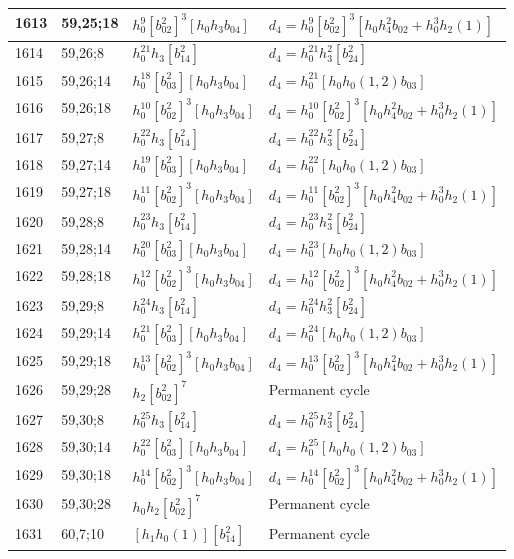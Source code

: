\documentclass{article}
\begin{document}
\begin{longtable}{|l|l|>{\raggedright\arraybackslash}p{6cm}|>{\raggedright\arraybackslash}p{6cm}|}
\hline
1613 & 59,25;18 & $h_0^9[b_{02}^2]^3[h_0h_3b_{04}]$ &$d_{4}=h_0^9[b_{02}^2]^3[h_0h_4^2b_{02} + h_0^3h_2(1)]$\\
\hline
1614 & 59,26;8 & $h_0^{21}h_3[b_{14}^2]$ &$d_{4}=h_0^{21}h_3^2[b_{24}^2]$\\
\hline
1615 & 59,26;14 & $h_0^{18}[b_{03}^2][h_0h_3b_{04}]$ &$d_{4}=h_0^{21}[h_0h_0(1, 2)b_{03}]$\\
\hline
1616 & 59,26;18 & $h_0^{10}[b_{02}^2]^3[h_0h_3b_{04}]$ &$d_{4}=h_0^{10}[b_{02}^2]^3[h_0h_4^2b_{02} + h_0^3h_2(1)]$\\
\hline
1617 & 59,27;8 & $h_0^{22}h_3[b_{14}^2]$ &$d_{4}=h_0^{22}h_3^2[b_{24}^2]$\\
\hline
1618 & 59,27;14 & $h_0^{19}[b_{03}^2][h_0h_3b_{04}]$ &$d_{4}=h_0^{22}[h_0h_0(1, 2)b_{03}]$\\
\hline
1619 & 59,27;18 & $h_0^{11}[b_{02}^2]^3[h_0h_3b_{04}]$ &$d_{4}=h_0^{11}[b_{02}^2]^3[h_0h_4^2b_{02} + h_0^3h_2(1)]$\\
\hline
1620 & 59,28;8 & $h_0^{23}h_3[b_{14}^2]$ &$d_{4}=h_0^{23}h_3^2[b_{24}^2]$\\
\hline
1621 & 59,28;14 & $h_0^{20}[b_{03}^2][h_0h_3b_{04}]$ &$d_{4}=h_0^{23}[h_0h_0(1, 2)b_{03}]$\\
\hline
1622 & 59,28;18 & $h_0^{12}[b_{02}^2]^3[h_0h_3b_{04}]$ &$d_{4}=h_0^{12}[b_{02}^2]^3[h_0h_4^2b_{02} + h_0^3h_2(1)]$\\
\hline
1623 & 59,29;8 & $h_0^{24}h_3[b_{14}^2]$ &$d_{4}=h_0^{24}h_3^2[b_{24}^2]$\\
\hline
1624 & 59,29;14 & $h_0^{21}[b_{03}^2][h_0h_3b_{04}]$ &$d_{4}=h_0^{24}[h_0h_0(1, 2)b_{03}]$\\
\hline
1625 & 59,29;18 & $h_0^{13}[b_{02}^2]^3[h_0h_3b_{04}]$ &$d_{4}=h_0^{13}[b_{02}^2]^3[h_0h_4^2b_{02} + h_0^3h_2(1)]$\\
\hline
1626 & 59,29;28 & $h_2[b_{02}^2]^7$ & Permanent cycle\\
\hline
1627 & 59,30;8 & $h_0^{25}h_3[b_{14}^2]$ &$d_{4}=h_0^{25}h_3^2[b_{24}^2]$\\
\hline
1628 & 59,30;14 & $h_0^{22}[b_{03}^2][h_0h_3b_{04}]$ &$d_{4}=h_0^{25}[h_0h_0(1, 2)b_{03}]$\\
\hline
1629 & 59,30;18 & $h_0^{14}[b_{02}^2]^3[h_0h_3b_{04}]$ &$d_{4}=h_0^{14}[b_{02}^2]^3[h_0h_4^2b_{02} + h_0^3h_2(1)]$\\
\hline
1630 & 59,30;28 & $h_0h_2[b_{02}^2]^7$ & Permanent cycle\\
\hline
1631 & 60,7;10 & $[h_1h_0(1)][b_{14}^2]$ & Permanent cycle\\

\end{longtable}
\end{document}
